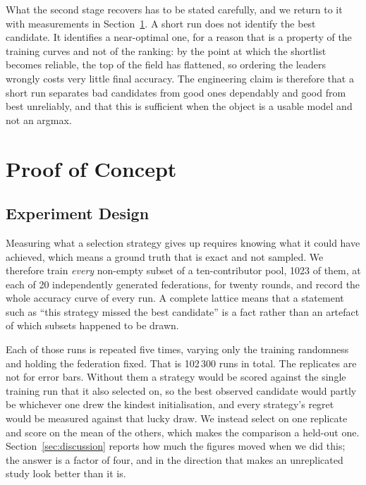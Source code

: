 \documentclass[10pt,conference]{IEEEtran}
\begin{document}
What the second stage recovers has to be stated carefully, and we return to it
with measurements in Section~\ref{sec:eval}. A short run does not identify the
best candidate. It identifies a near-optimal one, for a reason that is a property of the training curves and not of the ranking: by the point at
which the shortlist becomes reliable, the top of the field has flattened, so
ordering the leaders wrongly costs very little final accuracy. The engineering
claim is therefore that a short run separates bad candidates from good ones
dependably and good from best unreliably, and that this is sufficient when the object is a usable model and not an argmax.

\section{Proof of Concept}
\label{sec:eval}

\subsection{Experiment Design}

Measuring what a selection strategy gives up requires knowing what it could have
achieved, which means a ground truth that is exact and not sampled. We
therefore train \emph{every} non-empty subset of a ten-contributor pool, 1023 of
them, at each of 20 independently generated federations, for twenty rounds, and
record the whole accuracy curve of every run. A complete lattice means that a
statement such as ``this strategy missed the best candidate'' is a fact rather
than an artefact of which subsets happened to be drawn.

Each of those runs is repeated five times, varying only the training
randomness and holding the federation fixed. That is 102\,300 runs in total.
The replicates are not for error bars. Without them a strategy would be scored
against the single training run that it also selected on, so the best observed
candidate would partly be whichever one drew the kindest initialisation, and
every strategy's regret would be measured against that lucky draw. We instead
select on one replicate and score on the mean of the others, which makes the
comparison a held-out one. Section~\ref{sec:discussion} reports how much the
figures moved when we did this; the answer is a factor of four, and in the
direction that makes an unreplicated study look better than it is.
\end{document}
